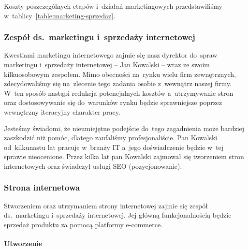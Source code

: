 \documentclass[12pt]{article}
\begin{document}
Koszty poszczególnych etapów i~działań marketingowych przedstawiliśmy w~tablicy~\ref{table:marketing-sprzedaz}.


\subsubsection{Zespół ds.\ marketingu i~sprzedaży internetowej}

Kwestiami marketingu internetowego zajmie się nasz dyrektor do~spraw marketingu i~sprzedaży internetowej -- Jan Kowalski -- wraz ze swoim kilkuosobowym zespołem.
Mimo obecności na~rynku wielu firm zewnętrznych, zdecydowaliśmy się na~zlecenie tego zadania osobie z~wewnątrz naszej firmy.
W~ten sposób nastąpi redukcja potencjalnych kosztów a~utrzymywanie stron oraz dostosowywanie się do~warunków rynku będzie sprawniejsze poprzez wewnętrzny iteracyjny charakter pracy.

Jesteśmy świadomi, że nieumiejętne podejście do~tego zagadnienia może bardziej zaszkodzić niż pomóc, dlatego zaufaliśmy profesjonaliście.
Pan Kowalski od~kilkunastu lat pracuje w~branży IT a~jego doświadczenie będzie w~tej sprawie nieocenione.
Przez kilka lat pan Kowalski zajmował się tworzeniem stron internetowych oraz świadczył usługi SEO (pozycjonowanie).


\subsubsection{Strona internetowa}

Stworzeniem oraz utrzymaniem strony internetowej zajmie się zespół ds.~marketingu i~sprzedaży internetowej.
Jej główną funkcjonalnością będzie sprzedaż produktu za pomocą platformy e-commerce.

\paragraph{Utworzenie}
\end{document}
